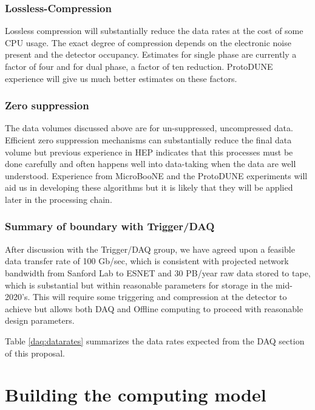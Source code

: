 \subsubsection{Lossless-Compression}

Lossless compression will substantially reduce the data rates at the cost of some CPU usage.  The exact degree of compression  depends on the electronic noise present and the detector occupancy.  Estimates for single phase are currently a factor of four and for dual phase, a factor of ten reduction.  ProtoDUNE experience will give us much better estimates on these factors.


\subsubsection{Zero suppression}

The data volumes discussed above are for un-suppressed, uncompressed data.  Efficient zero suppression mechanisms can substantially reduce the final data volume but previous experience in HEP indicates that this processes must be done carefully and often happens well into data-taking when the data are well understood.  Experience from MicroBooNE and the ProtoDUNE experiments will aid us in developing these algorithms but it is likely that they will be applied later in the processing chain.  

\subsubsection{Summary of boundary with Trigger/DAQ}

After discussion with the Trigger/DAQ group, we have agreed upon a feasible data transfer rate of 100 Gb/sec, which is consistent with projected network bandwidth from Sanford Lab to ESNET and 30 PB/year raw data stored to tape, which is substantial but within reasonable parameters for storage in the mid-2020's.  This will require some triggering and compression at the detector to achieve but allows both DAQ and Offline computing to proceed with reasonable design parameters.

Table \ref{daq:datarates} summarizes the data rates expected from the DAQ section of this proposal. 



\section{Building the computing model}\label{sw:bld-cmp-mdl}

